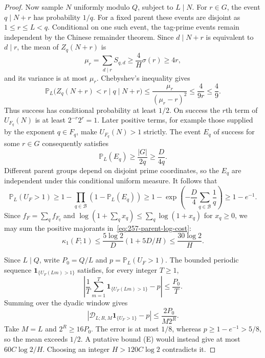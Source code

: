\begin{proof}
Now sample $N$ uniformly modulo $Q$, subject to $L\mid N$.
For $r\in G$, the event $q\mid N+r$ has probability $1/q$.
For a fixed parent these events are disjoint as $1\le r\le L<q$.
Conditional on one such event, the tag-prime events remain independent
by the Chinese remainder theorem.  Since $d\mid N+r$ is equivalent to
$d\mid r$, the mean of $Z_q(N+r)$ is
\[
 \mu_r=\sum_{d\mid r}S_{q,d}
 \ge\frac4H\sigma(r)\ge4r,
\]
and its variance is at most $\mu_r$.
Chebyshev's inequality gives
\[
 \mathbb P_L\bigl(Z_q(N+r)<r\mid q\mid N+r\bigr)
 \le\frac{\mu_r}{(\mu_r-r)^2}
 \le\frac4{9r}\le\frac49.
\]
Thus success has conditional probability at least $1/2$.
On success the $r$th term of $U_{F_q}(N)$ is at least
$2^{-r}2^r=1$.  Later positive terms, for example those supplied by the
exponent $q\in F_q$, make $U_{F_q}(N)>1$ strictly.
The event $E_q$ of success for some $r\in G$ consequently satisfies
\[
 \mathbb P_L(E_q)\ge\frac{|G|}{2q}\ge\frac{D}{4q}.
\]
Different parent groups depend on disjoint prime coordinates, so the
$E_q$ are independent under this conditional uniform measure.  It follows
that
\[
 \mathbb P_L(U_F>1)\ge
 1-\prod_{q\in\mathcal B}(1-\mathbb P_L(E_q))
 \ge1-\exp\left(-\frac D4\sum_{q\in\mathcal B}\frac1q\right)
 \ge1-e^{-1}.
\]
Since $f_F=\sum_qf_{F_q}$ and
$\log(1+\sum_qx_q)\le\sum_q\log(1+x_q)$ for $x_q\ge0$,
we may sum the positive majorants in~\eqref{eq:257-parent-log-cost}:
\[
 \kappa_1(F;1)\le\frac{5\log2}{D}(1+5D/H)
 \le\frac{30\log2}{H}.
\]

Since $L\mid Q$, write $P_0=Q/L$ and $p=\mathbb P_L(U_F>1)$.  The bounded periodic
sequence $\mathbf1_{\{U_F(Lm)>1\}}$ satisfies, for every integer $T\ge1$,
\[
 \left|\frac1T\sum_{m=1}^{T}\mathbf1_{\{U_F(Lm)>1\}}-p\right|
 \le\frac{P_0}{T}.
\]
Summing over the dyadic window gives
\[
 \left|\mathscr D_{L;R,M}\mathbf1_{\{U_F>1\}}-p\right|
 \le\frac{2P_0}{M2^R}.
\]
Take $M=L$ and $2^R\ge16P_0$.  The error is at most $1/8$, whereas
$p\ge1-e^{-1}>5/8$, so the mean exceeds $1/2$.
A putative bound (E) would instead give at most $60C\log2/H$.
Choosing an integer $H>120C\log2$ contradicts it.
\end{proof}

